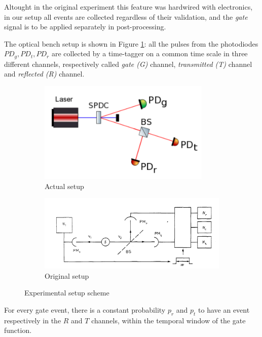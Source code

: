 \documentclass[10pt, final]{article}
\begin{document}
\begin{multicols}{2}
Altought in the original experiment this feature was hardwired with electronics, in our setup all events are collected regardless of their validation, and the \emph{gate} signal is to be applied separately in post-processing.

The optical bench setup is shown in Figure \ref{our}: all the pulses from the photodiodes $PD_g, PD_t, PD_r$ are collected by a time-tagger on a common time scale in three different channels, respectively called \emph{gate (G)} channel, \emph{transmitted (T)} channel and \emph{reflected (R)} channel.


\begin{mdframed}
    \begin{figure}[H]
        \begin{subfigure}{\textwidth}
            \centering
            \includegraphics[width = 0.9\textwidth]{../images/our_setup.png}
            \caption{Actual setup}
            \label{our}
        \end{subfigure}

        \begin{subfigure}{\textwidth}
            \centering
            \includegraphics[width = \textwidth]{../images/original.png}
            \caption{Original setup}
        \end{subfigure}
        \caption{Experimental setup scheme}
    \end{figure}
\end{mdframed}
For every gate event, there is a constant probability $p_r$ and $p_t$ to have an event respectively in the $R$ and $T$ channels, within the temporal window of the gate function. 


\end{multicols}
\end{document}
